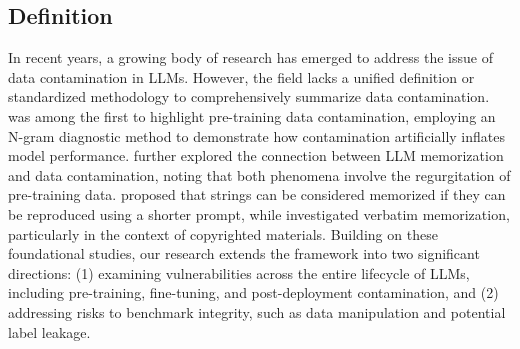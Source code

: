 \label{sec:what}
\subsection{Definition}


In recent years, a growing body of research has emerged to address the issue of data contamination in LLMs. However, the field lacks a unified definition or standardized methodology to comprehensively summarize data contamination. \citet{brown2020language} was among the first to highlight pre-training data contamination, employing an N-gram diagnostic method to demonstrate how contamination artificially inflates model performance. \citet{hartmann2023sok} further explored the connection between LLM memorization and data contamination, noting that both phenomena involve the regurgitation of pre-training data. \citet{schwarzschild2024rethinkingllmmemorizationlens} proposed that strings can be considered memorized if they can be reproduced using a shorter prompt, while \citet{karamolegkou-etal-2023-copyright} investigated verbatim memorization, particularly in the context of copyrighted materials. Building on these foundational studies, our research extends the framework into two significant directions: (1) examining vulnerabilities across the entire lifecycle of LLMs, including pre-training, fine-tuning, and post-deployment contamination, and (2) addressing risks to benchmark integrity, such as data manipulation and potential label leakage.

